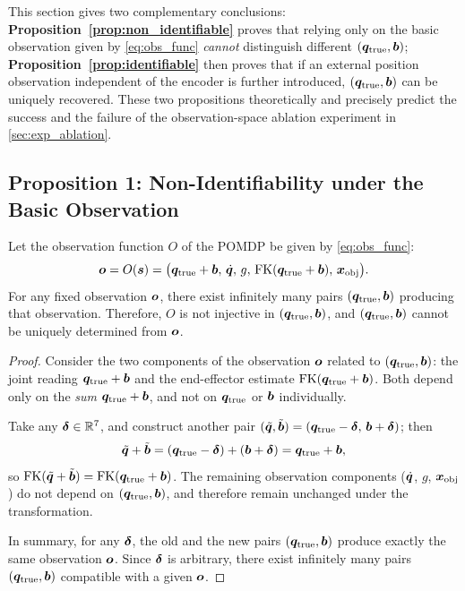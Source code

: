This section gives two complementary conclusions: \textbf{Proposition~\ref{prop:non_identifiable}} proves that relying only on the basic observation given by \cref{eq:obs_func} \emph{cannot} distinguish different $(\bm{q}_{\text{true}}, \bm{b})$; \textbf{Proposition~\ref{prop:identifiable}} then proves that if an external position observation independent of the encoder is further introduced, $(\bm{q}_{\text{true}}, \bm{b})$ can be uniquely recovered. These two propositions theoretically and precisely predict the success and the failure of the observation-space ablation experiment in \cref{sec:exp_ablation}.

\subsection{Proposition 1: Non-Identifiability under the Basic Observation}\label{subsec:unidentifiable}

\begin{proposition}\label{prop:non_identifiable}
Let the observation function $O$ of the POMDP be given by \cref{eq:obs_func}:
\[
  \bm{o} = O(\bm{s}) = \big(\bm{q}_{\text{true}} + \bm{b},\,\dot{\bm{q}},\,g,\,\text{FK}(\bm{q}_{\text{true}} + \bm{b}),\,\bm{x}_{\text{obj}}\big).
\]
For any fixed observation $\bm{o}$, there exist infinitely many pairs $(\bm{q}_{\text{true}}, \bm{b})$ producing that observation. Therefore, $O$ is not injective in $(\bm{q}_{\text{true}}, \bm{b})$, and $(\bm{q}_{\text{true}}, \bm{b})$ cannot be uniquely determined from $\bm{o}$.
\end{proposition}

\begin{proof}
Consider the two components of the observation $\bm{o}$ related to $(\bm{q}_{\text{true}}, \bm{b})$: the joint reading $\bm{q}_{\text{true}} + \bm{b}$ and the end-effector estimate $\text{FK}(\bm{q}_{\text{true}} + \bm{b})$. Both depend only on the \emph{sum} $\bm{q}_{\text{true}} + \bm{b}$, and not on $\bm{q}_{\text{true}}$ or $\bm{b}$ individually.

Take any $\bm{\delta} \in \mathbb{R}^7$, and construct another pair $(\tilde{\bm{q}}, \tilde{\bm{b}}) = (\bm{q}_{\text{true}} - \bm{\delta},\,\bm{b} + \bm{\delta})$; then
\[
  \tilde{\bm{q}} + \tilde{\bm{b}} = (\bm{q}_{\text{true}} - \bm{\delta}) + (\bm{b} + \bm{\delta}) = \bm{q}_{\text{true}} + \bm{b},
\]
so $\text{FK}(\tilde{\bm{q}} + \tilde{\bm{b}}) = \text{FK}(\bm{q}_{\text{true}} + \bm{b})$. The remaining observation components ($\dot{\bm{q}}$, $g$, $\bm{x}_{\text{obj}}$) do not depend on $(\bm{q}_{\text{true}}, \bm{b})$, and therefore remain unchanged under the transformation.

In summary, for any $\bm{\delta}$, the old and the new pairs $(\bm{q}_{\text{true}}, \bm{b})$ produce exactly the same observation $\bm{o}$. Since $\bm{\delta}$ is arbitrary, there exist infinitely many pairs $(\bm{q}_{\text{true}}, \bm{b})$ compatible with a given $\bm{o}$.\end{proof}

